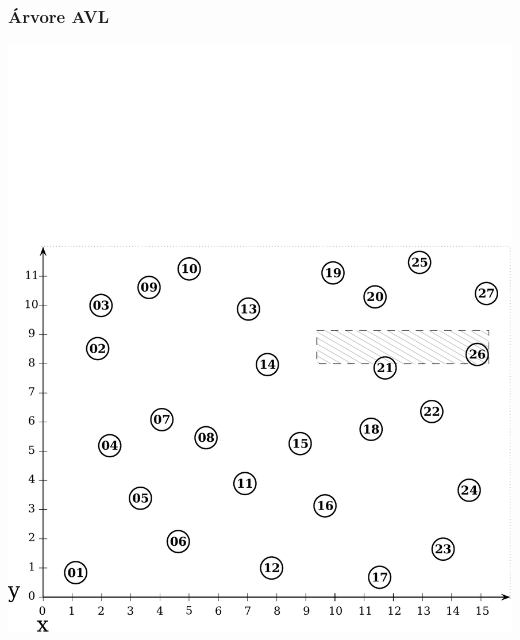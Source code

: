 \documentclass[10pt,xcolor=table,fleqn]{beamer}
\begin{document}
\begin{frame}
  \frametitle{Árvore AVL}
  \begin{center}
    \includegraphics[scale=0.3]{../img/points-query/avl/points}
  \end{center}
\end{frame}
\end{document}
